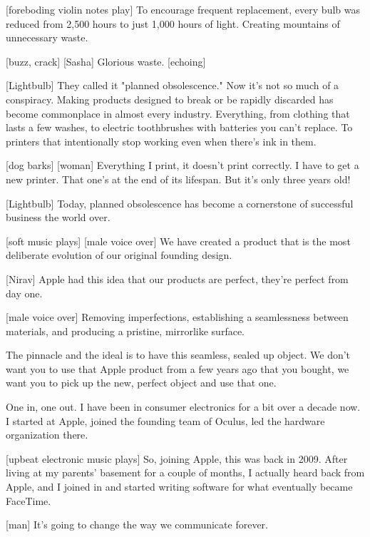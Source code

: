 \documentclass[a4paper]{article}
\begin{document}
	
	[foreboding violin notes play]
	To encourage frequent replacement, every bulb was reduced from 2,500 hours to just 1,000 hours of light.
	Creating mountains of unnecessary waste.
	
	
	[buzz, crack]
	[Sasha] Glorious waste. [echoing]
	
	
	[Lightbulb] They called it "planned obsolescence."
	Now it's not so much of a conspiracy.
	Making products designed to break or be rapidly discarded has become commonplace in almost every industry.
	Everything, from clothing that lasts a few washes, to electric toothbrushes with batteries you can't replace.
	To printers that intentionally stop working even when there's ink in them.
	
	
	
	[dog barks]
	[woman] Everything I print, it doesn't print correctly.
	I have to get a new printer. That one's at the end of its lifespan.
	But it's only three years old!
	
	
	
	[Lightbulb] Today, planned obsolescence has become a cornerstone of successful business the world over.
	
	
	
	[soft music plays]
	[male voice over] We have created a product that is the most deliberate evolution of our original founding design.
	
	
	
	[Nirav] Apple had this idea that our products are perfect, they're perfect from day one.
	
	
	[male voice over] Removing imperfections, establishing a seamlessness between materials, and producing a pristine, mirrorlike surface.


	The pinnacle and the ideal is to have this seamless, sealed up object.
	We don't want you to use that Apple product from a few years ago that you bought, we want you to pick up the new, perfect object and use that one.


	One in, one out.
	I have been in consumer electronics for a bit over a decade now.
	I started at Apple, joined the founding team of Oculus, led the hardware organization there.
	
	
	
	[upbeat electronic music plays]
	So, joining Apple, this was back in 2009.
	After living at my parents' basement for a couple of months, I actually heard back from Apple, and I joined in and started writing software for what eventually became FaceTime.
	
	
	[man] It's going to change the way we communicate forever.
	
\end{document}
